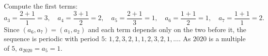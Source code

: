 Compute the first terms:
\[
a_3=\dfrac{2+1}{1}=3,\quad a_4=\dfrac{3+1}{2}=2,\quad a_5=\dfrac{2+1}{3}=1,\quad a_6=\dfrac{1+1}{2}=1,\quad a_7=\dfrac{1+1}{1}=2 .
\]
Since $(a_6,a_7)=(a_1,a_2)$ and each term depends only on the two before it, the sequence is periodic with period $5$: $1,2,3,2,1,1,2,3,2,1,\dots$. As $2020$ is a multiple of $5$, $a_{2020}=a_5=\boxed{1}$.
